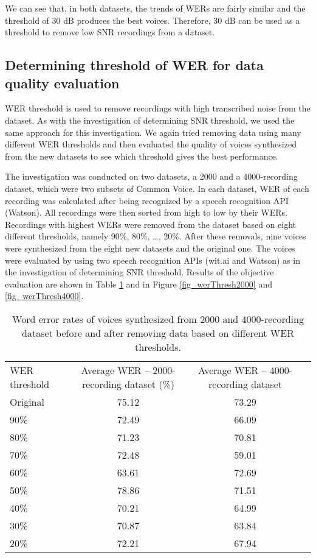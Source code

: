 \documentclass[12pt]{article}
\begin{document}
We can see that, in both datasets, the trends of WERs are fairly similar and the threshold of 30 dB produces the best voices. Therefore, 30 dB can be used as a threshold to remove low SNR recordings from a dataset.

\subsection{Determining threshold of WER for data quality evaluation}
WER threshold is used to remove recordings with high transcribed noise from the dataset. As with the investigation of determining SNR threshold, we used the same approach for this investigation. We again tried removing data using many different WER thresholds and then evaluated the quality of voices synthesized from the new datasets to see which threshold gives the best performance.

The investigation was conducted on two datasets, a 2000 and a 4000-recording dataset, which were two subsets of Common Voice. In each dataset, WER of each recording was calculated after being recognized by a speech recognition API (Watson). All recordings were then sorted from high to low by their WERs. Recordings with highest WERs were removed from the dataset based on eight different thresholds, namely 90\%, 80\%, …, 20\%. After these removals, nine voices were synthesized from the eight new datasets and the original one. The voices were evaluated by using two speech recognition APIs (wit.ai and Watson) as in the investigation of determining SNR threshold. Results of the objective evaluation are shown in Table \ref{tab_werWerThresh} and in Figure \ref{fig_werThresh2000} and \ref{fig_werThresh4000}.

\begin{table}[]
\begin{center}
\caption{Word error rates of voices synthesized from 2000 and 4000-recording dataset before and after removing data based on different WER thresholds.}
\label{tab_werWerThresh}
\vspace{3mm}
\begin{tabular}{lccc}
\hline
WER threshold & Average WER – 2000-recording dataset (\%) & Average WER – 4000-recording dataset\\
\cmidrule(l{0pt}r{2pt}){1-1}\cmidrule(l{0pt}r{2pt}){2-2}\cmidrule(l{0pt}r{2pt}){3-3}
Original & 75.12 & 73.29\\
90\%     & 72.49 & 66.09\\
80\%     & 71.23 & 70.81\\
70\%     & 72.48 & 59.01\\
60\%     & 63.61 & 72.69\\
50\%     & 78.86 & 71.51\\
40\%     & 70.21 & 64.99\\
30\%     & 70.87 & 63.84\\
20\%     & 72.21 & 67.94\\
\hline
\end{tabular}
\end{center}
\end{table}
\end{document}
